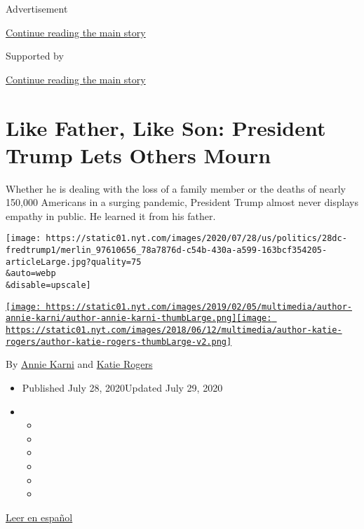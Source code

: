 Advertisement

\protect\hyperlink{after-top}{Continue reading the main story}

Supported by

\protect\hyperlink{after-sponsor}{Continue reading the main story}

\hypertarget{like-father-like-son-president-trump-lets-others-mourn}{%
\section{Like Father, Like Son: President Trump Lets Others
Mourn}\label{like-father-like-son-president-trump-lets-others-mourn}}

Whether he is dealing with the loss of a family member or the deaths of
nearly 150,000 Americans in a surging pandemic, President Trump almost
never displays empathy in public. He learned it from his father.

\texttt{[image: https://static01.nyt.com/images/2020/07/28/us/politics/28dc-fredtrump1/merlin\_97610656\_78a7876d-c54b-430a-a599-163bcf354205-articleLarge.jpg?quality=75\\\&auto=webp\\\&disable=upscale]}

\href{https://www.nytimes.com/by/annie-karni}{\texttt{[image: https://static01.nyt.com/images/2019/02/05/multimedia/author-annie-karni/author-annie-karni-thumbLarge.png]}}\href{https://www.nytimes.com/by/katie-rogers}{\texttt{[image: https://static01.nyt.com/images/2018/06/12/multimedia/author-katie-rogers/author-katie-rogers-thumbLarge-v2.png]}}

By \href{https://www.nytimes.com/by/annie-karni}{Annie Karni} and
\href{https://www.nytimes.com/by/katie-rogers}{Katie Rogers}

\begin{itemize}
\item
  Published July 28, 2020Updated July 29, 2020
\item
  \begin{itemize}
  \item
  \item
  \item
  \item
  \item
  \item
  \end{itemize}
\end{itemize}

\href{https://www.nytimes.com/es/2020/07/31/espanol/estados-unidos/fred-trump-donald-trump.html}{Leer
en español}

